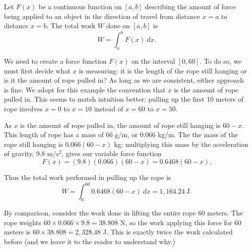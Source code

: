 {Let $F(x)$ be a continuous function on $[a,b]$ describing the amount of force being applied to an object in the direction of travel from distance $x=a$ to distance $x=b$. The total work $W$ done on $[a,b]$ is
\[W = \int_a^b F(x)\ dx.\]}


{We need to create a force function $F(x)$ on the interval $[0,60]$. To do so, we must first decide what $x$ is measuring: it is the length of the rope still hanging or is it the amount of rope pulled in? As long as we are consistent, either approach is fine. We adopt for this example the convention that $x$ is the amount of rope pulled in. This seems to match intuition better; pulling up the first 10 meters of rope involves $x=0$ to $x=10$ instead of $x=60$ to $x=50$. 

As $x$ is the amount of rope pulled in, the amount of rope still hanging is $60-x$. This length of rope has a mass of 66 g/m, or $0.066$ kg/m. The the mass of the rope still hanging is $0.066(60-x)$ kg; multiplying this mass by the acceleration of gravity, 9.8 m/s$^2$, gives our variable force function
\[F(x) = (9.8)(0.066)(60-x) = 0.6468(60-x).\]

Thus the total work performed in pulling up the rope is 
\[W = \int_0^{60} 0.6468(60-x)\ dx = 1,164.24\ \text{J}.\]

By comparison, consider the work done in lifting the entire rope 60 meters. The rope weights $60\times 0.066 \times 9.8 = 38.808$ N, so the work applying this force for 60 meters is $60\times 38.808 = 2,328.48$ J. This is exactly twice the work calculated before (and we leave it to the reader to understand why.)}

